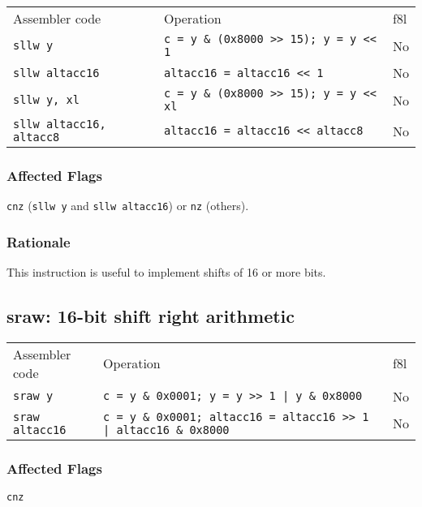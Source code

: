 \documentclass{book}
\begin{document}
\begin{tabular}{l l l}
Assembler code                  & Operation                                     & f8l \\
\texttt{sllw y}                 & \texttt{c = y \& (0x8000 >> 15); y = y << 1}  & No \\
\texttt{sllw altacc16}          & \texttt{altacc16 = altacc16 << 1}             & No \\
\texttt{sllw y, xl}             & \texttt{c = y \& (0x8000 >> 15); y = y << xl} & No \\
\texttt{sllw altacc16, altacc8} & \texttt{altacc16 = altacc16 << altacc8}       & No \\
\end{tabular}

\subsubsection*{Affected Flags}

\texttt{cnz} (\texttt{sllw y} and \texttt{sllw altacc16}) or \texttt{nz} (others).

\subsubsection*{Rationale}

This instruction is useful to implement shifts of 16 or more bits.


\subsection{sraw: 16-bit shift right arithmetic}

\begin{tabular}{l l l}
Assembler code         & Operation                                                               & f8l \\
\texttt{sraw y}        & \texttt{c = y \& 0x0001; y = y >> 1 | y \& 0x8000}                      & No \\
\texttt{sraw altacc16} & \texttt{c = y \& 0x0001; altacc16 = altacc16 >> 1 | altacc16 \& 0x8000} & No \\
\end{tabular}

\subsubsection*{Affected Flags}

\texttt{cnz}
\end{document}
